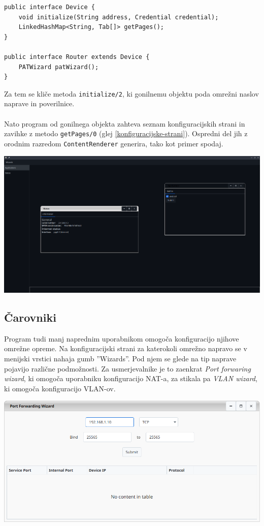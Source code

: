 \documentclass[12pt]{article}
\begin{document}
\begin{lstlisting}[style=JavaStyle]
public interface Device {
	void initialize(String address, Credential credential);
	LinkedHashMap<String, Tab[]> getPages();
}

public interface Router extends Device {
	PATWizard patWizard();
}
\end{lstlisting}
Za tem se kliče metoda \texttt{initialize/2}, ki gonilnemu objektu poda
omrežni naslov naprave in poverilnice.
\\\\
Nato program od gonilnega objekta zahteva seznam konfiguracijskih strani
in zavihke z metodo \texttt{getPages/0} (glej \ref{konfiguracijske-strani}).
Ospredni del jih z orodnim razredom \texttt{ContentRenderer} generira, tako
kot primer spodaj.

\begin{center}
	\includegraphics[scale=0.28]{slike/config-window.png}
\end{center}
\newpage

\subsection{Čarovniki}
Program tudi manj naprednim uporabnikom omogoča konfiguracijo njihove
omrežne opreme. Na konfiguracijski strani za katerokoli omrežno napravo
se v menijski vrstici nahaja gumb ''Wizards''. Pod njem se glede na tip
naprave pojavijo različne podmožnosti. Za usmerjevalnike je to zaenkrat
\textit{Port forwaring wizard}, ki omogoča uporabniku konfiguracijo NAT-a,
za stikala pa \textit{VLAN wizard}, ki omogoča konfiguracijo VLAN-ov.

\begin{center}
	\includegraphics[scale=0.56]{slike/pat-wizard.png}
\end{center}
\newpage
\end{document}

